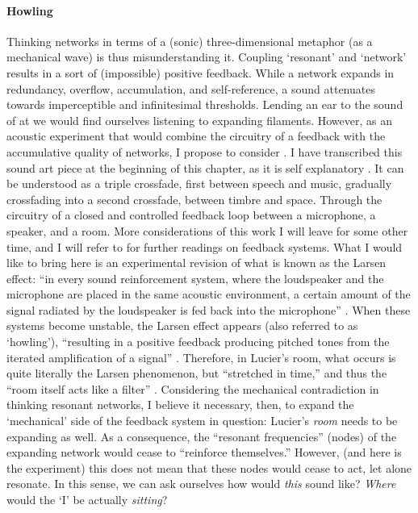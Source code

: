 \paragraph{Howling}
Thinking networks in terms of a (sonic) three-dimensional metaphor (as a mechanical wave) is thus misunderstanding it. Coupling `resonant' and `network' results in a sort of (impossible) positive feedback. While a network expands in redundancy, overflow, accumulation, and self-reference, a sound attenuates towards imperceptible and infinitesimal thresholds. Lending an ear to the sound of \gls{at} we would find ourselves listening to expanding filaments. However, as an acoustic experiment that would combine the circuitry of a feedback with the accumulative quality of networks, I propose to consider  . I have transcribed this sound art piece at the beginning of this chapter, as it is self explanatory . It can be understood as a triple crossfade, first between speech and music, gradually crossfading into a second crossfade, between timbre and space. Through the circuitry of a closed and controlled feedback loop between a microphone, a speaker, and a room. More considerations of this work I will leave for some other time, and I will refer to \textcite{icmc/bbp2372.2012.006} for further readings on feedback systems. What I would like to bring here is an experimental revision of what is known as the Larsen effect: ``in every sound reinforcement system, where the loudspeaker and the microphone are placed in the same acoustic environment, a certain amount of the signal radiated by the loudspeaker is fed back into the microphone'' \parencite[11]{Kro11:Aco}. When these systems become unstable, the Larsen effect appears (also referred to as `howling'), ``resulting in a positive feedback producing pitched tones from the iterated amplification of a signal'' \parencite[31]{icmc/bbp2372.2012.006}. Therefore, in Lucier's room, what occurs is quite literally the Larsen phenomenon, but ``stretched in time,'' and thus the ``room itself acts like a filter'' \parencite[34]{icmc/bbp2372.2012.006}. Considering the mechanical contradiction in thinking resonant networks, I believe it necessary, then, to expand the `mechanical' side of the feedback system in question: Lucier's \textit{room} needs to be expanding as well. As a consequence, the ``resonant frequencies'' (nodes) of the expanding network would cease to ``reinforce themselves.'' However, (and here is the experiment) this does not mean that these nodes would cease to act, let alone resonate. In this sense, we can ask ourselves how would \textit{this} sound like? \textit{Where} would the `I' be actually \textit{sitting}?

